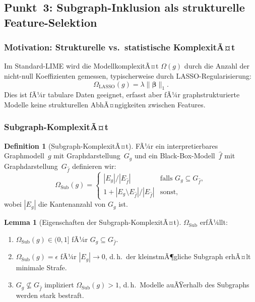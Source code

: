 ﻿\documentclass[a4paper,12pt]{article}
\theoremstyle{definition}
\newtheorem{definition}{Definition}[section]
\newtheorem{lemma}{Lemma}[section]
\begin{document}
\subsection{Punkt~3: Subgraph-Inklusion als strukturelle Feature-Selektion}

\subsubsection{Motivation: Strukturelle vs.\ statistische KomplexitÃ¤t}

Im Standard-LIME wird die ModellkomplexitÃ¤t $\Omega(g)$ durch die Anzahl der
nicht-null Koeffizienten gemessen, typischerweise durch LASSO-Regularisierung:
\[
  \Omega_{\mathrm{LASSO}}(g) = \lambda \|\boldsymbol{\beta}\|_1.
\]
Dies ist fÃ¼r tabulare Daten geeignet, erfasst aber fÃ¼r graphstrukturierte Modelle
keine strukturellen AbhÃ¤ngigkeiten zwischen Features.

\subsubsection{Subgraph-KomplexitÃ¤t}

\begin{definition}[Subgraph-KomplexitÃ¤t]
  FÃ¼r ein interpretierbares Graphmodell~$g$ mit Graphdarstellung~$G_g$ und ein
  Black-Box-Modell~$\hat{f}$ mit Graphdarstellung~$G_{\hat{f}}$ definieren wir:
  \begin{equation}
    \Omega_{\mathrm{Sub}}(g) = \begin{cases}
      |E_g| / |E_{\hat{f}}| & \text{falls } G_g \subseteq G_{\hat{f}}, \\
      1 + |E_g \setminus E_{\hat{f}}| / |E_{\hat{f}}| & \text{sonst,}
    \end{cases}
    \label{eq:omega_sub}
  \end{equation}
  wobei $|E_g|$ die Kantenanzahl von $G_g$ ist.
\end{definition}

\begin{lemma}[Eigenschaften der Subgraph-KomplexitÃ¤t]
  $\Omega_{\mathrm{Sub}}$ erfÃ¼llt:
  \begin{enumerate}
    \item $\Omega_{\mathrm{Sub}}(g) \in (0, 1]$ fÃ¼r $G_g \subseteq G_{\hat{f}}$.
    \item $\Omega_{\mathrm{Sub}}(g) = \epsilon$ fÃ¼r $|E_g| \to 0$, d.\,h.\ der
          kleinstmÃ¶gliche Subgraph erhÃ¤lt minimale Strafe.
    \item $G_g \not\subseteq G_{\hat{f}}$ impliziert $\Omega_{\mathrm{Sub}}(g) > 1$,
          d.\,h.\ Modelle auÃŸerhalb des Subgraphs werden stark bestraft.
  \end{enumerate}
\end{lemma}
\end{document}
